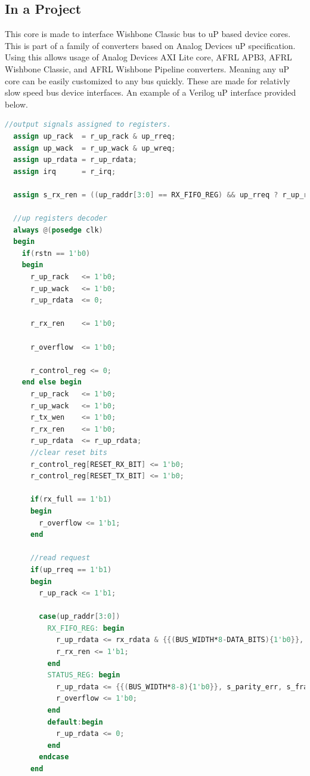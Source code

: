 

\subsection{In a Project}
\par
This core is made to interface Wishbone Classic bus to uP based device cores. This is part of a family of converters based on Analog Devices uP specification. Using this allows usage of Analog Devices AXI Lite core, AFRL APB3, AFRL Wishbone Classic, and AFRL Wishbone Pipeline converters. Meaning any uP core can be easily customized to any bus quickly. These are made for relativly slow speed bus device interfaces. An example of a Verilog uP interface provided below.

\begin{lstlisting}[language=Verilog]
  //output signals assigned to registers.
  assign up_rack  = r_up_rack & up_rreq;
  assign up_wack  = r_up_wack & up_wreq;
  assign up_rdata = r_up_rdata;
  assign irq      = r_irq;

  assign s_rx_ren = ((up_raddr[3:0] == RX_FIFO_REG) && up_rreq ? r_up_rack & r_rx_ren : 0);

  //up registers decoder
  always @(posedge clk)
  begin
    if(rstn == 1'b0)
    begin
      r_up_rack   <= 1'b0;
      r_up_wack   <= 1'b0;
      r_up_rdata  <= 0;

      r_rx_ren    <= 1'b0;

      r_overflow  <= 1'b0;

      r_control_reg <= 0;
    end else begin
      r_up_rack   <= 1'b0;
      r_up_wack   <= 1'b0;
      r_tx_wen    <= 1'b0;
      r_rx_ren    <= 1'b0;
      r_up_rdata  <= r_up_rdata;
      //clear reset bits
      r_control_reg[RESET_RX_BIT] <= 1'b0;
      r_control_reg[RESET_TX_BIT] <= 1'b0;

      if(rx_full == 1'b1)
      begin
        r_overflow <= 1'b1;
      end

      //read request
      if(up_rreq == 1'b1)
      begin
        r_up_rack <= 1'b1;

        case(up_raddr[3:0])
          RX_FIFO_REG: begin
            r_up_rdata <= rx_rdata & {{(BUS_WIDTH*8-DATA_BITS){1'b0}}, {DATA_BITS{1'b1}}};
            r_rx_ren <= 1'b1;
          end
          STATUS_REG: begin
            r_up_rdata <= {{(BUS_WIDTH*8-8){1'b0}}, s_parity_err, s_frame_err, r_overflow, r_irq_en, tx_full, tx_empty, rx_full, rx_valid};
            r_overflow <= 1'b0;
          end
          default:begin
            r_up_rdata <= 0;
          end
        endcase
      end


\end{lstlisting}
